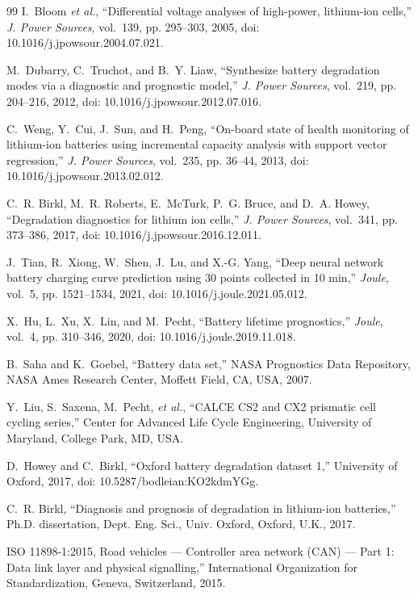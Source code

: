 \begin{thebibliography}{99}
I.~Bloom \emph{et al.}, ``Differential voltage analyses of high-power, lithium-ion cells,'' \emph{J. Power Sources}, vol.~139, pp. 295--303, 2005, doi: 10.1016/j.jpowsour.2004.07.021.

M.~Dubarry, C.~Truchot, and B.~Y. Liaw, ``Synthesize battery degradation modes via a diagnostic and prognostic model,'' \emph{J. Power Sources}, vol.~219, pp. 204--216, 2012, doi: 10.1016/j.jpowsour.2012.07.016.

C.~Weng, Y.~Cui, J.~Sun, and H.~Peng, ``On-board state of health monitoring of lithium-ion batteries using incremental capacity analysis with support vector regression,'' \emph{J. Power Sources}, vol.~235, pp. 36--44, 2013, doi: 10.1016/j.jpowsour.2013.02.012.

C.~R. Birkl, M.~R. Roberts, E.~McTurk, P.~G. Bruce, and D.~A. Howey, ``Degradation diagnostics for lithium ion cells,'' \emph{J. Power Sources}, vol.~341, pp. 373--386, 2017, doi: 10.1016/j.jpowsour.2016.12.011.

J.~Tian, R.~Xiong, W.~Shen, J.~Lu, and X.-G. Yang, ``Deep neural network battery charging curve prediction using 30 points collected in 10 min,'' \emph{Joule}, vol.~5, pp. 1521--1534, 2021, doi: 10.1016/j.joule.2021.05.012.

X.~Hu, L.~Xu, X.~Lin, and M.~Pecht, ``Battery lifetime prognostics,'' \emph{Joule}, vol.~4, pp. 310--346, 2020, doi: 10.1016/j.joule.2019.11.018.

B.~Saha and K.~Goebel, ``Battery data set,'' NASA Prognostics Data Repository, NASA Ames Research Center, Moffett Field, CA, USA, 2007.

Y.~Liu, S.~Saxena, M.~Pecht, \emph{et al.}, ``{CALCE} {CS2} and {CX2} prismatic cell cycling series,'' Center for Advanced Life Cycle Engineering, University of Maryland, College Park, MD, USA.

D.~Howey and C.~Birkl, ``Oxford battery degradation dataset 1,'' University of Oxford, 2017, doi: 10.5287/bodleian:KO2kdmYGg.

C.~R. Birkl, ``Diagnosis and prognosis of degradation in lithium-ion batteries,'' Ph.D. dissertation, Dept. Eng. Sci., Univ. Oxford, Oxford, U.K., 2017.

{ISO} 11898-1:2015, Road vehicles --- Controller area network ({CAN}) --- Part 1: Data link layer and physical signalling,'' International Organization for Standardization, Geneva, Switzerland, 2015.


\end{thebibliography}
